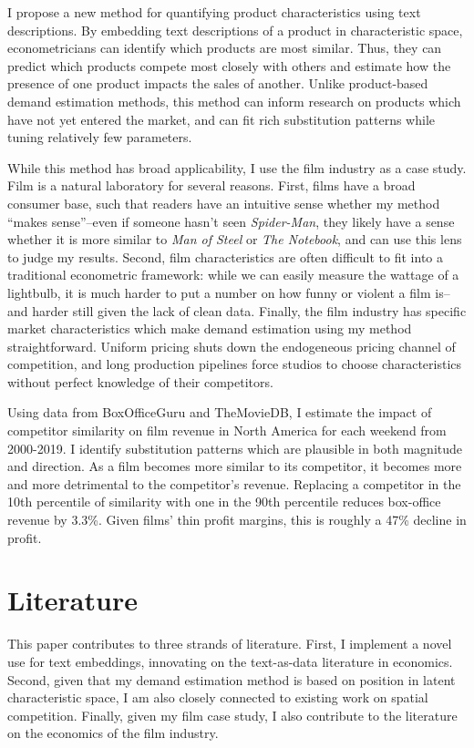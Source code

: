 \documentclass{article}
\begin{document}
I propose a new method for quantifying product characteristics using text descriptions. By embedding text descriptions of a product in characteristic space, econometricians can identify which products are most similar. Thus, they can predict which products compete most closely with others and estimate how the presence of one product impacts the sales of another. Unlike product-based demand estimation methods, this method can inform research on products which have not yet entered the market, and can fit rich substitution patterns while tuning relatively few parameters.

While this method has broad applicability, I use the film industry as a case study. Film is a natural laboratory for several reasons. First, films have a broad consumer base, such that readers have an intuitive sense whether my method ``makes sense''--even if someone hasn't seen \emph{Spider-Man}, they likely have a sense whether it is more similar to \emph{Man of Steel} or \emph{The Notebook}, and can use this lens to judge my results. Second, film characteristics are often difficult to fit into a traditional econometric framework: while we can easily measure the wattage of a lightbulb, it is much harder to put a number on how funny or violent a film is--and harder still given the lack of clean data. Finally, the film industry has specific market characteristics which make demand estimation using my method straightforward. Uniform pricing shuts down the endogeneous pricing channel of competition, and long production pipelines force studios to choose characteristics without perfect knowledge of their competitors.

Using data from BoxOfficeGuru and TheMovieDB, I estimate the impact of competitor similarity on film revenue in North America for each weekend from 2000-2019. I identify substitution patterns which are plausible in both magnitude and direction. As a film becomes more similar to its competitor, it becomes more and more detrimental to the competitor's revenue. Replacing a competitor in the 10th percentile of similarity with one in the 90th percentile reduces box-office revenue by 3.3\%. Given films' thin profit margins, this is roughly a 47\% decline in profit.

\section{Literature}

This paper contributes to three strands of literature. First, I implement a novel use for text embeddings, innovating on the text-as-data literature in economics. Second, given that my demand estimation method is based on position in latent characteristic space, I am also closely connected to existing work on spatial competition. Finally, given my film case study, I also contribute to the literature on the economics of the film industry. 
\end{document}
